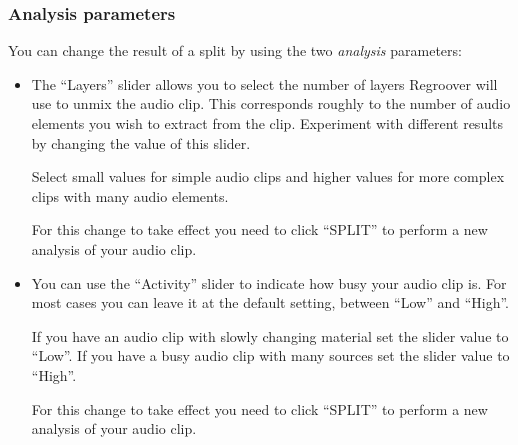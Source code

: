\documentclass[12pt]{article}
\begin{document}
\subsubsection*{Analysis parameters}
You can change the result of a split by using the two \textit{analysis} parameters:
\begin{itemize}
\item The ``Layers'' slider allows you to select the number of layers Regroover will use to unmix the audio clip. 
This corresponds roughly to the number of audio elements you wish to extract from the clip. Experiment with different results by changing the value of this slider.
\begin{mdframed}[style = tip]
Select small values for simple audio clips and higher values for more complex clips with many audio elements.
\end{mdframed}
\begin{mdframed}[style = warning]
For this change to take effect you need to click ``SPLIT'' to perform a new analysis of your audio clip.
\end{mdframed}
\item You can use the ``Activity'' slider to indicate how busy your audio clip is. For most cases you can leave it at the default setting, between ``Low'' and ``High''.
\begin{mdframed}[style = tip]
If you have an audio clip with slowly changing material set the slider value to ``Low''. If you have a busy audio clip with many sources set the slider value to ``High''. 
\end{mdframed}
\begin{mdframed}[style = warning]
For this change to take effect you need to click ``SPLIT'' to perform a new analysis of your audio clip.
\end{mdframed}
\end{itemize}
\end{document}

